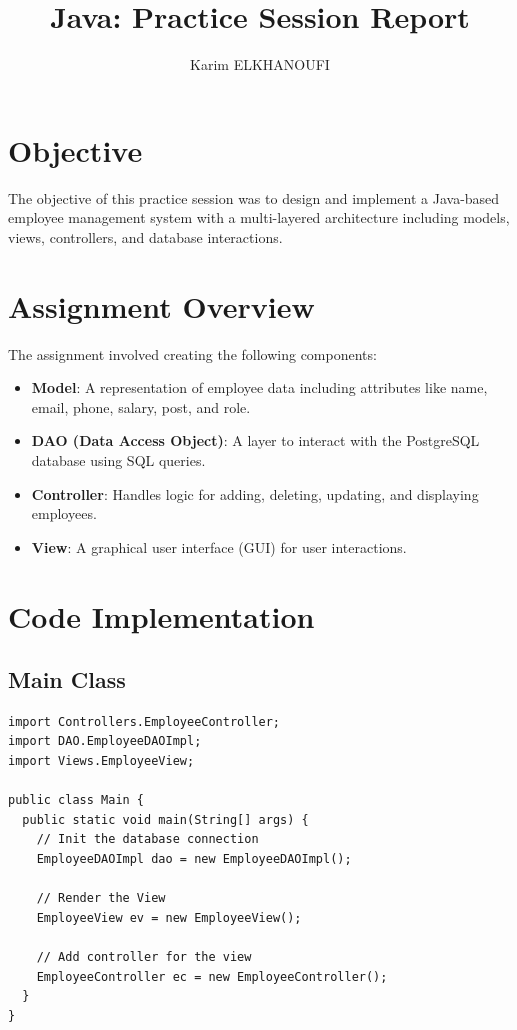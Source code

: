 \documentclass[12pt]{article}
\title{Java: Practice Session Report}
\author{Karim ELKHANOUFI}
\begin{document}
\maketitle

\newpage

\tableofcontents

\newpage

\section{Objective}
The objective of this practice session was to design and implement a
Java-based employee management system with a multi-layered architecture
including models, views, controllers, and database interactions.

\section{Assignment Overview}
The assignment involved creating the following components:
\begin{itemize}
    \item \textbf{Model}: A representation of employee data including
		attributes like name, email, phone, salary, post, and role.
    \item \textbf{DAO (Data Access Object)}: A layer to interact with the
		PostgreSQL database using SQL queries.
    \item \textbf{Controller}: Handles logic for adding, deleting, updating,
		and displaying employees.
    \item \textbf{View}: A graphical user interface (GUI) for user
		interactions.
\end{itemize}

\section{Code Implementation}

\subsection{Main Class}
\begin{lstlisting}
import Controllers.EmployeeController;
import DAO.EmployeeDAOImpl;
import Views.EmployeeView;

public class Main {
  public static void main(String[] args) {
    // Init the database connection
    EmployeeDAOImpl dao = new EmployeeDAOImpl();

    // Render the View
    EmployeeView ev = new EmployeeView();

    // Add controller for the view
    EmployeeController ec = new EmployeeController();
  }
}
\end{lstlisting}
\end{document}
